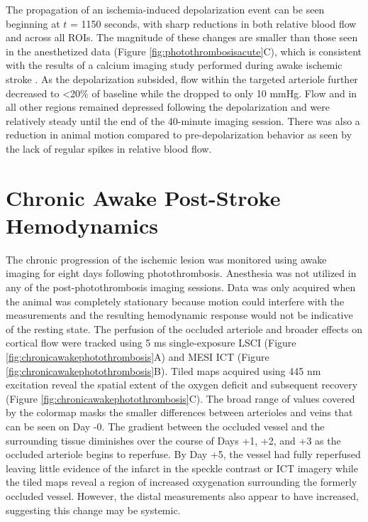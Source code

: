 The propagation of an ischemia-induced depolarization event can be seen beginning at $t$ = 1150 seconds, with sharp reductions in both relative blood flow and  across all ROIs. The magnitude of these changes are smaller than those seen in the anesthetized data (Figure \ref{fig:photothrombosisacute}C), which is consistent with the results of a calcium imaging study performed during awake ischemic stroke \cite{Balbi:2017cj}. As the depolarization subsided, flow within the targeted arteriole further decreased to \textless20\% of baseline while the  dropped to only 10 mmHg. Flow and  in all other regions remained depressed following the depolarization and were relatively steady until the end of the 40-minute imaging session. There was also a reduction in animal motion compared to pre-depolarization behavior as seen by the lack of regular spikes in relative blood flow.



\section{Chronic Awake Post-Stroke Hemodynamics}

The chronic progression of the ischemic lesion was monitored using awake imaging for eight days following photothrombosis. Anesthesia was not utilized in any of the post-photothrombosis imaging sessions. Data was only acquired when the animal was completely stationary because motion could interfere with the measurements and the resulting hemodynamic response would not be indicative of the resting state. The perfusion of the occluded arteriole and broader effects on cortical flow were tracked using 5 ms single-exposure LSCI (Figure \ref{fig:chronicawakephotothrombosis}A) and MESI ICT (Figure \ref{fig:chronicawakephotothrombosis}B). Tiled  maps acquired using 445 nm excitation reveal the spatial extent of the oxygen deficit and subsequent recovery (Figure \ref{fig:chronicawakephotothrombosis}C). The broad range of  values covered by the colormap masks the smaller differences between arterioles and veins that can be seen on Day -0. The gradient between the occluded vessel and the surrounding tissue diminishes over the course of Days +1, +2, and +3 as the occluded arteriole begins to reperfuse. By Day +5, the vessel had fully reperfused leaving little evidence of the infarct in the speckle contrast or ICT imagery while the tiled  maps reveal a region of increased oxygenation surrounding the formerly occluded vessel. However, the distal  measurements also appear to have increased, suggesting this change may be systemic.

